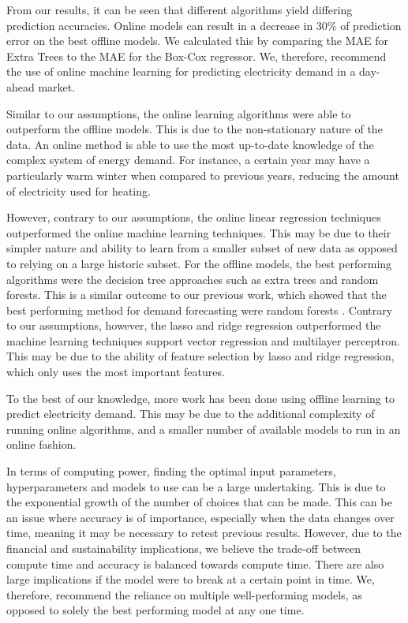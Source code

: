 \documentclass[final,3p,times,twocolumn,numbers]{elsarticle}
\begin{document}

From our results, it can be seen that different algorithms yield differing prediction accuracies. Online models can result in a decrease in 30\% of prediction error on the best offline models. We calculated this by comparing the MAE for Extra Trees to the MAE for the Box-Cox regressor. We, therefore, recommend the use of online machine learning for predicting electricity demand in a day-ahead market.

Similar to our assumptions, the online learning algorithms were able to outperform the offline models. This is due to the non-stationary nature of the data. An online method is able to use the most up-to-date knowledge of the complex system of energy demand. For instance, a certain year may have a particularly warm winter when compared to previous years, reducing the amount of electricity used for heating.

However, contrary to our assumptions, the online linear regression techniques outperformed the online machine learning techniques. This may be due to their simpler nature and ability to learn from a smaller subset of new data as opposed to relying on a large historic subset. For the offline models, the best performing algorithms were the decision tree approaches such as extra trees and random forests. This is a similar outcome to our previous work, which showed that the best performing method for demand forecasting were random forests \cite{Kell2018}. Contrary to our assumptions, however, the lasso and ridge regression outperformed the machine learning techniques support vector regression and multilayer perceptron. This may be due to the ability of feature selection by lasso and ridge regression, which only uses the most important features.

To the best of our knowledge, more work has been done using offline learning to predict electricity demand. This may be due to the additional complexity of running online algorithms, and a smaller number of available models to run in an online fashion.

In terms of computing power, finding the optimal input parameters, hyperparameters and models to use can be a large undertaking. This is due to the exponential growth of the number of choices that can be made. This can be an issue where accuracy is of importance, especially when the data changes over time, meaning it may be necessary to retest previous results. However, due to the financial and sustainability implications, we believe the trade-off between compute time and accuracy is balanced towards compute time. There are also large implications if the model were to break at a certain point in time. We, therefore, recommend the reliance on multiple well-performing models, as opposed to solely the best performing model at any one time. 
\end{document}
